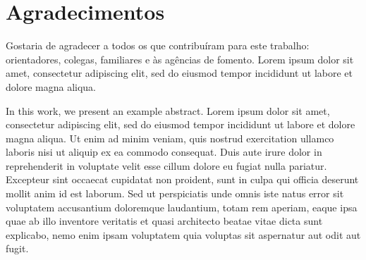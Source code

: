 \documentclass[dsc,pdfa]{coppe}
\begin{document}
  \maketitle

  \frontmatter
  \dedication{A alguém cujo valor é digno desta dedicatória.}

  \chapter*{Agradecimentos}

  Gostaria de agradecer a todos os que contribuíram para este trabalho:
  orientadores, colegas, familiares e às agências de fomento. Lorem ipsum
  dolor sit amet, consectetur adipiscing elit, sed do eiusmod tempor incididunt
  ut labore et dolore magna aliqua.

  \begin{abstract}%

  Apresenta-se, nesta tese, um exemplo de resumo. Lorem ipsum dolor sit amet,
  consectetur adipiscing elit, sed do eiusmod tempor incididunt ut labore et
  dolore magna aliqua. Ut enim ad minim veniam, quis nostrud exercitation
  ullamco laboris nisi ut aliquip ex ea commodo consequat. Duis aute irure dolor
  in reprehenderit in voluptate velit esse cillum dolore eu fugiat nulla
  pariatur. Excepteur sint occaecat cupidatat non proident, sunt in culpa qui
  officia deserunt mollit anim id est laborum. Sed ut perspiciatis unde omnis
  iste natus error sit voluptatem accusantium doloremque laudantium, totam rem
  aperiam, eaque ipsa quae ab illo inventore veritatis et quasi architecto beatae
  vitae dicta sunt explicabo, nemo enim ipsam voluptatem quia voluptas sit
  aspernatur aut odit aut fugit.

  \end{abstract}

  \begin{foreignabstract}

  In this work, we present an example abstract. Lorem ipsum dolor sit amet,
  consectetur adipiscing elit, sed do eiusmod tempor incididunt ut labore et
  dolore magna aliqua. Ut enim ad minim veniam, quis nostrud exercitation
  ullamco laboris nisi ut aliquip ex ea commodo consequat. Duis aute irure dolor
  in reprehenderit in voluptate velit esse cillum dolore eu fugiat nulla
  pariatur. Excepteur sint occaecat cupidatat non proident, sunt in culpa qui
  officia deserunt mollit anim id est laborum. Sed ut perspiciatis unde omnis
  iste natus error sit voluptatem accusantium doloremque laudantium, totam rem
  aperiam, eaque ipsa quae ab illo inventore veritatis et quasi architecto beatae
  vitae dicta sunt explicabo, nemo enim ipsam voluptatem quia voluptas sit
  aspernatur aut odit aut fugit.

  \end{foreignabstract}
\end{document}
